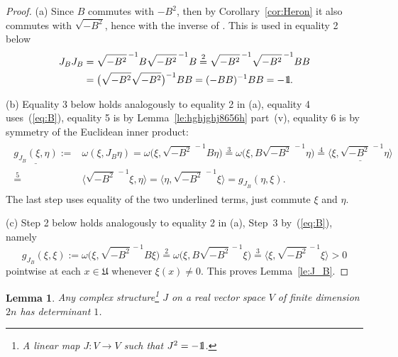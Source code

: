 \documentclass[pdftex]{sigma}
\numberwithin{equation}{section}
\newtheorem{Lemma}[Theorem]{Lemma}
\newcommand{\1}{{{\mathchoice {\rm 1\mskip-4mu l} {\rm 1\mskip-4mu l}
{\rm 1\mskip-4.5mu l} {\rm 1\mskip-5mu l}}}}
\begin{document}
\begin{proof}
(a) Since $B$ commutes with $-B^2$, then by Corollary~\ref{cor:Heron}
it also commutes with $\sqrt{-B^2}$, hence with the inverse of .
This is used in equality 2 below
\begin{align*}
 J_BJ_B
 &=\sqrt{-B^2}^{\,-1} B \sqrt{-B^2}^{\,-1} B
 \stackrel{2}{=}\sqrt{-B^2}^{\,-1}\sqrt{-B^2}^{\,-1} BB\\
 &=\bigl(\sqrt{-B^2}\sqrt{-B^2}\bigr)^{-1} BB
 =(-BB)^{-1} BB=-\1 .
\end{align*}

(b) Equality 3 below holds analogously to equality 2 in (a),
equality 4 uses~(\ref{eq:B}), equality 5 is by
Lemma~\ref{le:hghjghj8656h} part~(v),
equality 6 is by symmetry of the Euclidean inner product:{\samepage
\begin{align*}
\begin{split}
 \underline{g_{J_B}(\xi,\eta)}
 :={}&\omega(\xi,J_B\eta)
 =\omega\big(\xi, \sqrt{-B^2}^{\,-1} B\eta\big)
 \stackrel{3}{=}\omega\big(\xi,B\sqrt{-B^2}^{\,-1}\eta\big)
 \stackrel{4}{=}\underline{\big\langle{\xi},{\sqrt{-B^2}^{\,-1}\eta}\big\rangle}\\
 \stackrel{5}{=}{}&\big\langle{\sqrt{-B^2}^{\,-1}\xi},{\eta}\big\rangle
 =\big\langle{\eta},{\sqrt{-B^2}^{\,-1}\xi}\big\rangle
 =g_{J_B}(\eta,\xi) .
 \end{split}
\end{align*}
The last step uses equality of the two underlined terms,
just commute $\xi$ and $\eta$.}

(c) Step 2 below holds analogously to equality 2 in (a),
Step~3 by~(\ref{eq:B}), namely
\begin{equation*}
 g_{J_B}(\xi,\xi)
 :=\omega\big(\xi, \sqrt{-B^2}^{\,-1} B\xi\big)
 \stackrel{2}{=}\omega\big(\xi, B\sqrt{-B^2}^{\,-1} \xi\big)
 \stackrel{3}{=}\big\langle{\xi},{\sqrt{-B^2}^{\,-1}\xi}\big\rangle
 >0
\end{equation*}
pointwise at each $x\in \mathfrak{U}$ whenever $\xi(x)\not=0$.
This proves Lemma~\ref{le:J_B}.
\end{proof}

\begin{Lemma}\label{le:J-det=1}
Any complex structure\footnote{A linear map $J\colon V\to V$ such that $J^2=-\1$.}
$J$ on a real vector space $V$ of finite dimension $2n$ has determinant $1$.
\end{Lemma}
\end{document}
